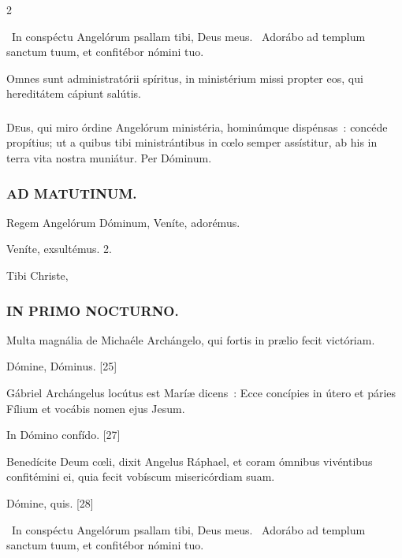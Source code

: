 \documentclass[9pt,twoside]{extarticle}
\begin{document}
\begin{multicols}{2}
{{{\begin{tightlist}{}
\item {}~In conspéctu Angelórum psallam tibi, Deus meus. ~Adorábo ad templum sanctum tuum, et confitébor nómini tuo.
\item {} Omnes sunt administratórii spíritus, in ministérium missi propter eos, qui hereditátem cápiunt salútis.
\end{tightlist}

\subsubsection*{\center {}}
\lettrine{D}eus, qui miro órdine Angelórum ministéria, hominúmque dispénsas~: concéde propítius; ut a quibus tibi ministrántibus in cœlo semper assístitur, ab his in terra vita nostra muniátur. Per Dóminum.

\subsubsection*{\center \textsc{AD MATUTINUM.}}
\begin{tightlist}{}
\item {} Regem Angelórum Dóminum, \textred{*} Veníte, adorémus.
\item {} Veníte, exsultémus. 2.
\item {} Tibi Christe, 
\end{tightlist}

\subsubsection*{\center \textsc{IN PRIMO NOCTURNO.}}
\begin{tightlist}{}
\item {} Multa magnália de Michaéle Archángelo, qui fortis in prælio fecit victóriam.
\item {} Dómine, Dóminus. [25] 
\item {} Gábriel Archángelus locútus est Maríæ dicens~: Ecce concípies in útero et páries Fílium et vocábis nomen ejus Jesum.
\item {} In Dómino confído. [27]
\item {} Benedícite Deum cœli, dixit Angelus Ráphael, et coram ómnibus vivéntibus confitémini ei, quia fecit vobíscum misericórdiam suam.
\item {} Dómine, quis. [28]
\item {}~In conspéctu Angelórum psallam tibi, Deus meus. ~Adorábo ad templum sanctum tuum, et confitébor nómini tuo.
\item {}
\end{tightlist}

}}}
\end{multicols}
\end{document}
